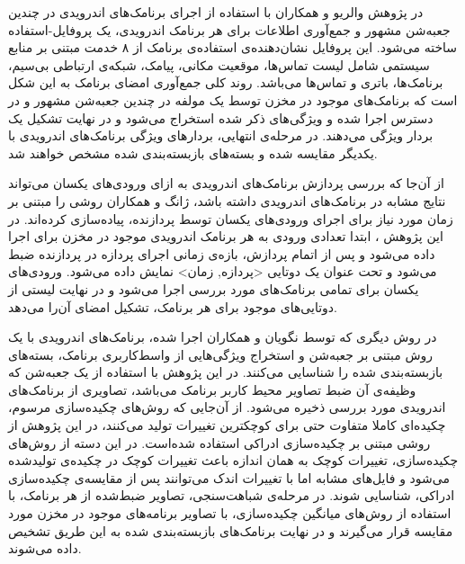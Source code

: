 در پژوهش والریو و همکاران با استفاده از اجرای برنامک‌های اندرویدی در چندین جعبه‌شن مشهور و جمع‌آوری اطلاعات برای هر برنامک اندرویدی، یک پروفایل-استفاده‌ ساخته می‌شود. این پروفایل نشان‌دهنده‌ی استفاده‌ی برنامک از ۸ خدمت مبتنی بر منابع سیستمی شامل لیست‌ تماس‌ها، موقعیت‌ مکانی، پیامک‌‌، شبکه‌ی ارتباطی‌ بی‌سیم‌، برنامک‌ها، باتری و تماس‌ها می‌باشد. روند کلی جمع‌آوری امضا‌ی برنامک به این شکل است که برنامک‌های موجود در مخزن توسط یک مولفه در چندین جعبه‌شن مشهور و در دسترس اجرا شده و ویژگی‌های ذکر شده استخراج می‌شود و در نهایت تشکیل یک بردار ویژگی می‌دهند. در مرحله‌ی انتهایی، بردار‌های ویژگی برنامک‌های اندرویدی با یکدیگر مقایسه شده و بسته‌های بازبسته‌بندی شده مشخص خواهند شد.

از آن‌جا که بررسی پردازش‌ برنامک‌های اندرویدی به ازای ورودی‌های یکسان می‌تواند نتایج مشابه در برنامک‌های اندرویدی داشته باشد، ژانگ و همکاران روشی را مبتنی بر زمان مورد نیاز برای اجرای ورودی‌های یکسان توسط پردازنده‌، پیاده‌سازی کرده‌اند. در این پژوهش ، ابتدا تعدادی ورودی به هر برنامک اندرویدی موجود در مخزن برای اجرا داده می‌شود و پس از اتمام پردازش، بازه‌ی زمانی اجرای پردازه در پردازنده ضبط می‌شود و تحت عنوان یک دوتایی <پردازه, زمان> نمایش داده می‌شود. ورودی‌های یکسان برای تمامی برنامک‌های مورد بررسی اجرا می‌شود و در نهایت لیستی از دوتایی‌های موجود برای هر برنامک، تشکیل امضای آن‌‌را می‌دهد. 

در روش دیگری که توسط نگویان و همکاران اجرا شده‌، برنامک‌های اندرویدی با یک روش مبتنی بر جعبه‌شن و استخراج ویژگی‌هایی از واسط‌کاربری برنامک، بسته‌های بازبسته‌بندی شده را شناسایی می‌کنند. در این پژوهش با استفاده از یک جعبه‌شن که وظیفه‌ی آن ضبط تصاویر محیط کاربر برنامک می‌باشد، تصاویری از برنامک‌های اندرویدی مورد بررسی ذخیره می‌شود. از آن‌جایی که روش‌های چکیده‌سازی مرسوم، چکیده‌ای کاملا متفاوت حتی برای کوچکترین تغییرات تولید می‌کنند، در این پژوهش از روشی مبتنی بر چکیده‌سازی ادراکی‌ استفاده شده‌است. در این دسته از روش‌های چکیده‌سازی، تغییرات کوچک به همان اندازه باعث تغییرات کوچک در چکیده‌ی تولید‌شده می‌شود و فایل‌های مشابه اما با تغییرات اندک می‌توانند پس از مقایسه‌ی چکیده‌سازی ادراکی، شناسایی شوند. در مرحله‌ی شباهت‌سنجی، تصاویر ضبط‌شده از هر برنامک، با استفاده از روش‌های میانگین چکیده‌سازی‌، با تصاویر برنامه‌های موجود در مخزن مورد مقایسه قرار می‌گیرند و در نهایت برنامک‌های بازبسته‌بندی شده به این طریق تشخیص داده می‌شوند. 

